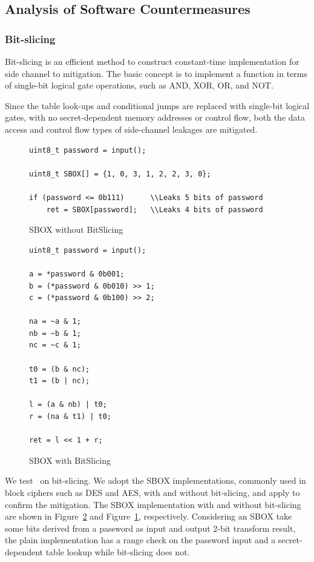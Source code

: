 \subsection{Analysis of Software Countermeasures}\label{sec:eval_countermeasures}
\subsubsection{Bit-slicing}
Bit-slicing is an efficient method to construct constant-time implementation for side channel to mitigation. The basic concept is to implement a function in terms of single-bit logical gate operations, such as AND, XOR, OR, and NOT\@.

Since the table look-ups and conditional jumps are replaced with single-bit logical gates, with no secret-dependent memory addresses or control flow, both the data access and control flow types of side-channel leakages are mitigated.
\begin{figure}[h!]
    \centering
    \begin{lstlisting}[xleftmargin=.02\textwidth,xrightmargin=.01\textwidth]
uint8_t password = input();

uint8_t SBOX[] = {1, 0, 3, 1, 2, 2, 3, 0};

if (password <= 0b111)      \\Leaks 5 bits of password
    ret = SBOX[password];   \\Leaks 4 bits of password
      \end{lstlisting}
    \caption{SBOX without BitSlicing}
    \label{fig:SBOX_da}
\end{figure}


\begin{figure}[h!]
    \centering
    \begin{lstlisting}[xleftmargin=.02\textwidth,xrightmargin=.01\textwidth]
uint8_t password = input();

a = *password & 0b001;
b = (*password & 0b010) >> 1;
c = (*password & 0b100) >> 2;

na = ~a & 1;
nb = ~b & 1;
nc = ~c & 1;

t0 = (b & nc);
t1 = (b | nc);

l = (a & nb) | t0;
r = (na & t1) | t0;

ret = l << 1 + r;
\end{lstlisting}
\caption{SBOX with BitSlicing}
\label{fig:SBOX_bitslicing}
\end{figure}
We test \tool\ on bit-slicing. We adopt the SBOX
implementations, commonly used in block ciphers such as DES and AES, with and
without bit-slicing, and apply \tool{} to confirm the mitigation. The SBOX implementation with and without bit-slicing are shown in Figure~\ref{fig:SBOX_bitslicing} and Figure~\ref{fig:SBOX_da}, respectively. Considering an SBOX take some bits derived from a password as input and output 2-bit transform result, the plain implementation
has a range check on the password input and a secret-dependent table lookup while bit-slicing does not.

